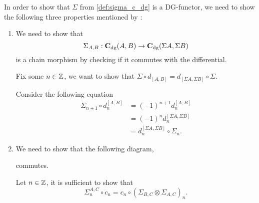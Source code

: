 \begin{remark}
    In order to show that \( \Sigma \) from \autoref{def:sigma_c_dg} is a DG-functor, we need to show the following three properties mentioned by \cite[Definition 6.2.3]{Borceux_1994}:
    \begin{enumerate}
        \item {
            We need to show that
            \[
                \Sigma_{A, B}: \operatorname{\mathbf{C}}_{\operatorname{dg}}(A, B) \to \operatorname{\mathbf{C}}_{\operatorname{dg}}(\Sigma A, \Sigma B)
            \]
            is a chain morphism by checking if it commutes with the differential.

            Fix some \( n \in {\mathbb{Z}} \), we want to show that \( \Sigma \circ d_{[A, B]} = d_{[\Sigma A, \Sigma B]} \circ \Sigma \).

            Consider the following equation
            \begin{align*}
                \Sigma_{n + 1} \circ d_n^{[A, B]} &= (-1)^{n + 1} d_n^{[A, B]} \\
                &= (-1)^n d_n^{[\Sigma A, \Sigma B]} \\
                &= d_n^{[\Sigma A, \Sigma B]} \circ \Sigma_n.
            \end{align*}
        }
        \item {
            We need to show that the following diagram,
            \begin{center}
            \end{center}
            commutes.

            Let \( n \in {\mathbb{Z}} \), it is sufficient to show that
            \[
                \Sigma_n^{A, C} \circ c_n = c_n \circ (\Sigma_{B, C} \otimes \Sigma_{A, C})_n.
            \]

}
\end{enumerate}
\end{remark}

